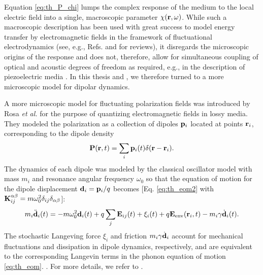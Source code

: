 Equation \eqref{eq:th_P_chi} lumps the complex response of the medium to the local electric field into a single, macroscopic parameter $\chi(\mathbf{r},\omega)$. While such a macroscopic description has been used with great success to model energy transfer by electromagnetic fields in the framework of fluctuational electrodynamics \cite{rytov} (see, e.g., Refs. \cite{joulain05} and \cite{volokitin07} for reviews), it disregards the microscopic origins of the response and does not, therefore, allow for simultaneous coupling of optical and acoustic degrees of freedom as required, e.g., in the description of piezoelectric media \cite{}. In this thesis and , we therefore turned to a more microscopic model for dipolar dynamics. %

A more microscopic model for fluctuating polarization fields was introduced by Rosa \textit{et al.} \cite{rosa10,rosa11} for the purpose of quantizing electromagnetic fields in lossy media. They modeled the polarization as a collection of dipoles $\mathbf{p}_i$ located at points $\mathbf{r}_i$, corresponding to the dipole density
\begin{equation}
 \mathbf{P}(\mathbf{r},t) = \sum_i \mathbf{p}_i(t) \delta(\mathbf{r}-\mathbf{r}_i).
\end{equation}
The dynamics of each dipole was modeled by the classical oscillator model with mass $m_i$ and resonance angular frequency $\omega_0$ so that the equation of motion for the dipole displacement $\mathbf{d}_i=\mathbf{p}_i/q$ becomes \cite{rosa10,rosa11} [Eq. \eqref{eq:th_eom2} with $\mathbf{K}_{ij}^{\alpha\beta}=m\omega_0^2\delta_{ij}\delta_{\alpha\beta}$]: 
\begin{equation}
 m_i \ddot{\mathbf{d}}_i(t) = - m \omega_0^2 \mathbf{d}_i(t) +q\sum_{j} \mathbf{E}_{ij}(t)+\xi_i(t)+ q\mathbf{E}_{\textrm{env}}(\mathbf{r}_i,t) - m_i \gamma \dot{\mathbf{d}}_i(t). \label{eq:th_eom2b}
\end{equation}
The stochastic Langeving force $\xi_i$ and friction $m_i\gamma \dot{\mathbf{d}}_i$ account for mechanical fluctuations and dissipation in dipole dynamics, respectively, and are equivalent to the corresponding Langevin terms in the phonon equation of motion \eqref{eq:th_eom}.  \cite{jackson}. For more details, we refer to . %

